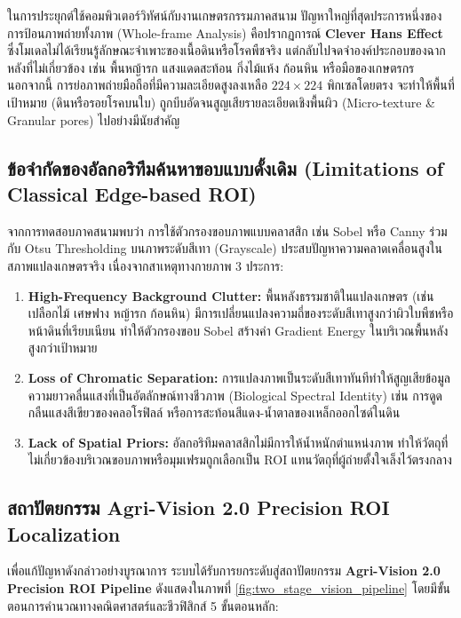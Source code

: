 ในการประยุกต์ใช้คอมพิวเตอร์วิทัศน์กับงานเกษตรกรรมภาคสนาม ปัญหาใหญ่ที่สุดประการหนึ่งของการป้อนภาพถ่ายทั้งภาพ (Whole-frame Analysis) คือปรากฏการณ์ \textbf{Clever Hans Effect} ซึ่งโมเดลไม่ได้เรียนรู้ลักษณะจำเพาะของเนื้อดินหรือโรคพืชจริง แต่กลับไปจดจำองค์ประกอบของฉากหลังที่ไม่เกี่ยวข้อง เช่น พื้นหญ้ารก แสงแดดสะท้อน กิ่งไม้แห้ง ก้อนหิน หรือมือของเกษตรกร นอกจากนี้ การย่อภาพถ่ายมือถือที่มีความละเอียดสูงลงเหลือ $224 \times 224$ พิกเซลโดยตรง จะทำให้พื้นที่เป้าหมาย (ดินหรือรอยโรคบนใบ) ถูกบีบอัดจนสูญเสียรายละเอียดเชิงพื้นผิว (Micro-texture \& Granular pores) ไปอย่างมีนัยสำคัญ

\subsection{ข้อจำกัดของอัลกอริทึมค้นหาขอบแบบดั้งเดิม (Limitations of Classical Edge-based ROI)}
จากการทดสอบภาคสนามพบว่า การใช้ตัวกรองขอบภาพแบบคลาสสิก เช่น Sobel หรือ Canny ร่วมกับ Otsu Thresholding บนภาพระดับสีเทา (Grayscale) ประสบปัญหาความคลาดเคลื่อนสูงในสภาพแปลงเกษตรจริง เนื่องจากสาเหตุทางกายภาพ 3 ประการ:
\begin{enumerate}
    \item \textbf{High-Frequency Background Clutter:} พื้นหลังธรรมชาติในแปลงเกษตร (เช่น เปลือกไม้ เศษฟาง หญ้ารก ก้อนหิน) มีการเปลี่ยนแปลงความถี่ของระดับสีเทาสูงกว่าผิวใบพืชหรือหน้าดินที่เรียบเนียน ทำให้ตัวกรองขอบ Sobel สร้างค่า Gradient Energy ในบริเวณพื้นหลังสูงกว่าเป้าหมาย
    \item \textbf{Loss of Chromatic Separation:} การแปลงภาพเป็นระดับสีเทาทันทีทำให้สูญเสียข้อมูลความยาวคลื่นแสงที่เป็นอัตลักษณ์ทางชีวภาพ (Biological Spectral Identity) เช่น การดูดกลืนแสงสีเขียวของคลอโรฟิลล์ หรือการสะท้อนสีแดง-น้ำตาลของเหล็กออกไซด์ในดิน
    \item \textbf{Lack of Spatial Priors:} อัลกอริทึมคลาสสิกไม่มีการให้น้ำหนักตำแหน่งภาพ ทำให้วัตถุที่ไม่เกี่ยวข้องบริเวณขอบภาพหรือมุมเฟรมถูกเลือกเป็น ROI แทนวัตถุที่ผู้ถ่ายตั้งใจเล็งไว้ตรงกลาง
\end{enumerate}

\subsection{สถาปัตยกรรม Agri-Vision 2.0 Precision ROI Localization}
เพื่อแก้ปัญหาดังกล่าวอย่างบูรณาการ ระบบได้รับการยกระดับสู่สถาปัตยกรรม \textbf{Agri-Vision 2.0 Precision ROI Pipeline} ดังแสดงในภาพที่ \ref{fig:two_stage_vision_pipeline} โดยมีขั้นตอนการคำนวณทางคณิตศาสตร์และชีวฟิสิกส์ 5 ขั้นตอนหลัก:

